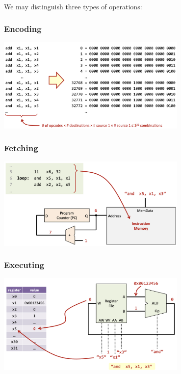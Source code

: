 We may distinguish three types of operations: \newline
\subsubsection*{Encoding}
\begin{center}
    \includegraphics[width=0.7\textwidth]{chapters/chapter1/images/encoding.png}
\end{center}
\subsubsection*{Fetching}
\begin{center}
    \includegraphics[width=0.7\textwidth]{chapters/chapter1/images/fetching.png}
\end{center}
\subsubsection*{Executing}
\begin{center}
    \includegraphics[width=0.7\textwidth]{chapters/chapter1/images/executing.png}
\end{center}


